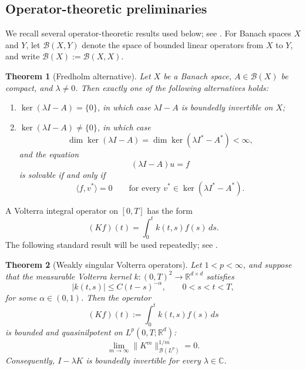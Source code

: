 \documentclass[preprint,12pt]{elsarticle}
\newtheorem{theorem}{Theorem}[section]
\theoremstyle{definition}
\theoremstyle{plain}
\begin{document}
\subsection{Operator-theoretic preliminaries}

We recall several operator-theoretic results used below; see
\cite{brezis2011functional,evans2010partial}. For Banach spaces $X$ and $Y$,
let $\mathcal B(X,Y)$ denote the space of bounded linear operators from $X$
to $Y$, and write $\mathcal B(X):=\mathcal B(X,X)$.

\begin{theorem}[Fredholm alternative]
\label{thm:fredholm_alternative}
Let $X$ be a Banach space, $A\in\mathcal B(X)$ be compact, and
$\lambda\neq0$. Then exactly one of the following alternatives holds:
\begin{enumerate}
    \item
    $\ker(\lambda I-A)=\{0\}$, in which case $\lambda I-A$ is boundedly
    invertible on $X$;
    \item
    $\ker(\lambda I-A)\neq\{0\}$, in which case
    \begin{equation*}
        \dim\ker(\lambda I-A)
        =
        \dim\ker(\lambda I^*-A^*)
        <\infty,
    \end{equation*}
    and the equation
    \begin{equation*}
        (\lambda I-A)u=f
    \end{equation*}
    is solvable if and only if
    \begin{equation*}
        \langle f,v^*\rangle=0
        \qquad
        \text{for every }
        v^*\in\ker(\lambda I^*-A^*).
    \end{equation*}
\end{enumerate}
\end{theorem}

A Volterra integral operator on $[0,T]$ has the form
\begin{equation*}
    (Kf)(t)
    =
    \int_0^t k(t,s)f(s)\,ds.
\end{equation*}
The following standard result will be used repeatedly; see
\cite[Sec.~9, Cor.~3.18]{gripenberg1990volterra}.

\begin{theorem}[Weakly singular Volterra operators]
\label{volterra}
Let $1<p<\infty$, and suppose that the measurable Volterra kernel
$k:(0,T)^2\to\mathbb R^{d\times d}$ satisfies
\begin{equation*}
    |k(t,s)|
    \leq
    C(t-s)^{-\alpha},
    \qquad
    0<s<t<T,
\end{equation*}
for some $\alpha\in(0,1)$. Then the operator
\begin{equation*}
    (Kf)(t)
    :=
    \int_0^t k(t,s)f(s)\,ds
\end{equation*}
is bounded and quasinilpotent on $L^p(0,T;\mathbb R^d)$:
\begin{equation*}
    \lim_{m\to\infty}
    \|K^m\|_{\mathcal B(L^p)}^{1/m}
    =
    0.
\end{equation*}
Consequently, $I-\lambda K$ is boundedly invertible for every
$\lambda\in\mathbb C$.
\end{theorem}
\end{document}
